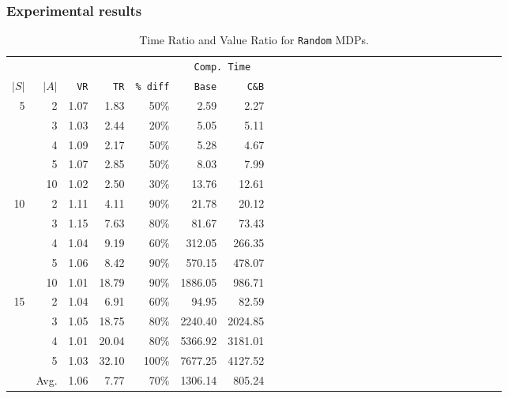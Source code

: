 \documentclass{beamer}
\begin{document}
\begin{frame}
\frametitle{Experimental results}

\begin{table}[h] %
 \setlength{\tabcolsep}{2.5pt}
 \renewcommand \arraystretch{1.0}
\begin{center}
\begin{tabular}{rrrrrrrrrrrrrrrrrrrrrrrrrrrr}
	&		&				&				&				&	\multicolumn{2}{c}{	\texttt{Comp. Time}}	\\
$|S|$	&	$|A|$	&		\texttt{VR}		&		\texttt{TR}		&		\texttt{\% diff}		&	\texttt{Base}	&	\texttt{C\&B}	\\
\cmidrule(lr){1-2} \cmidrule(lr){3-3} \cmidrule(lr){4-4}  \cmidrule(lr){5-5}  \cmidrule(lr){6-7}
5	&	2	&			1.07	&			1.83	&			50\%	&	2.59	&	2.27	\\
	&	3	&			1.03	&			2.44	&			20\%	&	5.05	&	5.11	\\
	&	4	&			1.09	&			2.17	&			50\%	&	5.28	&	4.67	\\
	&	5	&			1.07	&			2.85	&			50\%	&	8.03	&	7.99	\\
	&	10	&			1.02	&			2.50	&			30\%	&	13.76	&	12.61	\\
\cmidrule(lr){1-2} \cmidrule(lr){3-3} \cmidrule(lr){4-4}  \cmidrule(lr){5-5}  \cmidrule(lr){6-7}
10	&	2	&			1.11	&			4.11	&			90\%	&	21.78	&	20.12	\\
	&	3	&			1.15	&			7.63	&			80\%	&	81.67	&	73.43	\\
	&	4	&			1.04	&			9.19	&			60\%	&	312.05	&	266.35	\\
	&	5	&			1.06	&			8.42	&			90\%	&	570.15	&	478.07	\\
	&	10	&			1.01	&			18.79	&			90\%	&	1886.05	&	986.71	\\
\cmidrule(lr){1-2} \cmidrule(lr){3-3} \cmidrule(lr){4-4}  \cmidrule(lr){5-5}  \cmidrule(lr){6-7}
15	&	2	&			1.04	&			6.91	&			60\%	&	94.95	&	82.59	\\
	&	3	&			1.05	&			18.75	&			80\%	&	2240.40	&	2024.85	\\
	&	4	&			1.01	&			20.04	&			80\%	&	5366.92	&	3181.01	\\
	&	5	&			1.03	&			32.10	&			100\%	&	7677.25	&	4127.52	\\
\cmidrule(lr){1-2} \cmidrule(lr){3-3} \cmidrule(lr){4-4}  \cmidrule(lr){5-5}  \cmidrule(lr){6-7}
	&	Avg.	&			1.06	&			7.77	&			70\%	&	1306.14	&	805.24	
\end{tabular}						
\end{center}
\caption{Time Ratio and Value Ratio for \texttt{Random} MDPs.}														\label{tab:random}								
\end{table}


\end{frame}
\end{document}
